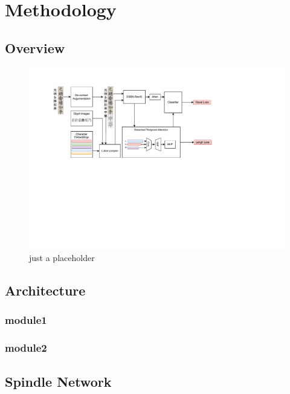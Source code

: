 \section{Methodology}

\subsection{Overview}

\begin{figure}[t]
\begin{center}
\includegraphics[width=1.0\linewidth]{figures/overall.pdf}
\end{center}
\caption{just a placeholder}
\label{fig:overall}
\end{figure}

\subsection{Architecture}
\subsubsection{module1}
\subsubsection{module2}

\subsection{Spindle Network}





